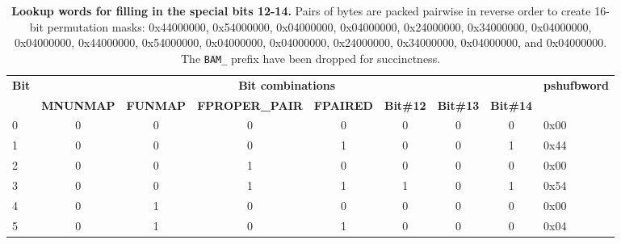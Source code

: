 \begin{table}[]
\centering
\caption{\textbf{Lookup words for filling in the special bits 12-14.} Pairs of bytes are packed pairwise in reverse order to create 16-bit permutation masks: 0x44000000, 0x54000000, 0x04000000, 0x04000000, 0x24000000, 0x34000000, 0x04000000, 0x04000000, 0x44000000, 0x54000000, 0x04000000, 0x04000000, 0x24000000, 0x34000000, 0x04000000, and 0x04000000. The \texttt{BAM\_} prefix have been dropped for succinctness.}
\label{tab:expand-data2}
\begin{tabular}{|l|c|c|c|c|c|c|c|l|}
\hline
\multirow{2}{*}{\textbf{Bit}} & \multicolumn{7}{c|}{\textbf{Bit combinations}}                                                                                          & \multirow{2}{*}{\textbf{pshufbword}} \\ \cline{2-8}
                              & \textbf{MNUNMAP} & \textbf{FUNMAP} & \textbf{FPROPER\_PAIR} & \textbf{FPAIRED} & \textbf{Bit\#12} & \textbf{Bit\#13} & \textbf{Bit\#14} &                                      \\ \hline
0                             & 0                & 0               & 0                      & 0                & 0                & 0                & 0                & 0x00                                 \\ \hline
1                             & 0                & 0               & 0                      & 1                & 0                & 0                & 1                & 0x44                                 \\ \hline
2                             & 0                & 0               & 1                      & 0                & 0                & 0                & 0                & 0x00                                 \\ \hline
3                             & 0                & 0               & 1                      & 1                & 1                & 0                & 1                & 0x54                                 \\ \hline
4                             & 0                & 1               & 0                      & 0                & 0                & 0                & 0                & 0x00                                 \\ \hline
5                             & 0                & 1               & 0                      & 1                & 0                & 0                & 0                & 0x04                                 \\ \hline

\end{tabular}
\end{table}
